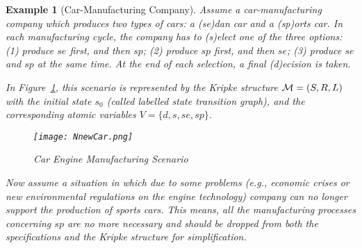 \documentclass{article}
\newtheorem{example}{Example}
\begin{document}
\begin{example}[Car-Manufacturing Company]\label{car_manufacturing}
Assume a car-manufacturing company which produces two types of cars: a (se)dan car and a (sp)orts car. In each manufacturing cycle, the company has to (s)elect one of the three options: (1) produce $se$  first, and then $sp$; (2) produce $sp$ first, and then $se$; (3) produce $se$ and $sp$ at the same time. At the end of each selection, a final (d)ecision is taken.

In Figure~\ref{BVM}, this scenario is  represented by the Kripke structure ${\cal M}=(S, R, L)$ with the initial state $s_0$ (called labelled state transition graph),  and the corresponding atomic variables $V=\{d,s,se,sp\}$.
\begin{figure}[ht]
  \centering
  \texttt{[image: NnewCar.png]}\\
  \caption{Car Engine Manufacturing Scenario }\label{BVM}
\end{figure}
Now assume a situation in which due to some problems (e.g., economic crises or new environmental regulations on the engine technology) company can no longer support the production of sports cars.
This means, all the manufacturing processes concerning $sp$ are no more necessary and should be dropped from both the specifications and the Kripke structure for simplification.
\end{example}




\end{document}
